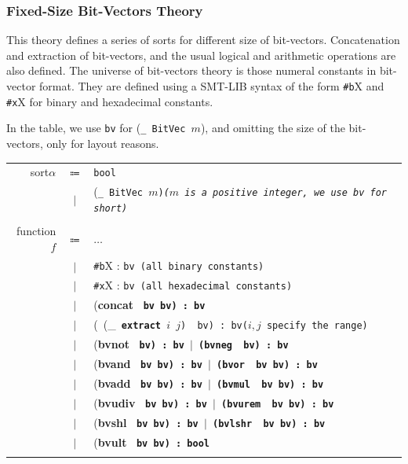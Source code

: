 \documentclass[10pt,letter]{article}
\theoremstyle{definition}
\begin{document}
\subsubsection{Fixed-Size Bit-Vectors Theory}
This theory defines a series of sorts for different size of bit-vectors. Concatenation and extraction of bit-vectors, and the usual logical and arithmetic operations are also defined. The universe of bit-vectors theory is those numeral constants in bit-vector format. They are defined using a SMT-LIB syntax of the form {\tt \#b}X and {\tt \#x}X for binary and hexadecimal constants.

In the table, we use {\tt bv} for ({\tt \_\ BitVec $m$}), and omitting the size of the bit-vectors, only for layout reasons.


\begin{table}[!h]
\begin{mdframed}
\centering
\begin{tabular}{r c l}
sort\qquad $\alpha$ & $\Coloneqq$ & \tt bool \\
& $\mid$ & \rm(\tt \_\ BitVec $m$\rm)\it\quad \rm($m$ \rm is a positive integer, we use {\tt bv} for short)\\
\\
function\qquad $f$ & $\Coloneqq$ & $\ldots$ \\
& $\mid$ & {\tt \#b}X \rm : \tt bv \rm\qquad (all binary constants)\\
& $\mid$ & {\tt \#x}X \rm : \tt bv \rm\qquad (all hexadecimal constants)\\
& $\mid$ & (\bf concat \tt\ bv bv\rm) : \tt bv \\
& $\mid$ & \rm(\ (\_\tt\ {\bf extract}\ $i$\ $j$\rm) \tt\ bv\rm) : \tt bv\rm\qquad ($i, j$ specify the range)\\
& $\mid$ & (\bf bvnot \tt\ bv\rm) : \tt bv \rm$\mid$ (\bf bvneg \tt\ bv\rm) : \tt bv \\
& $\mid$ & (\bf bvand \tt\ bv bv\rm) : \tt bv \rm$\mid$ (\bf bvor \tt\ bv bv\rm) : \tt bv \\
& $\mid$ & (\bf bvadd \tt\ bv bv\rm) : \tt bv \rm$\mid$ (\bf bvmul \tt\ bv bv\rm) : \tt bv \\
& $\mid$ & (\bf bvudiv \tt\ bv bv\rm) : \tt bv \rm$\mid$ (\bf bvurem \tt\ bv bv\rm) : \tt bv \\
& $\mid$ & (\bf bvshl \tt\ bv bv\rm) : \tt bv \rm$\mid$ (\bf bvlshr \tt\ bv bv\rm) : \tt bv \\
& $\mid$ & (\bf bvult \tt\ bv bv\rm) : \tt bool \\
\\

\end{tabular}
\end{mdframed}
\end{table}
\end{document}
